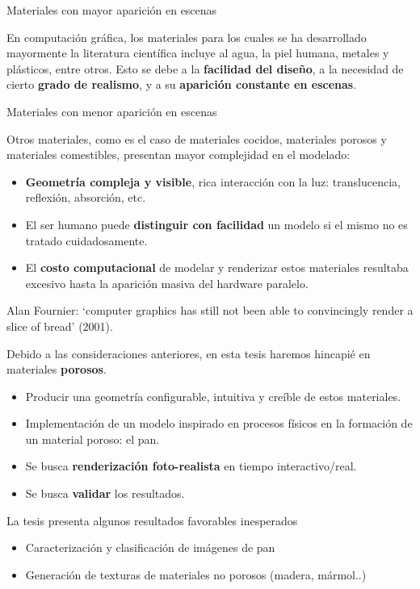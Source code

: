 \documentclass[spanish]{beamer}
\begin{document}
\begin{frame}{Materiales con mayor aparición en escenas}

En computación gráfica, los materiales para los cuales se ha desarrollado mayormente la literatura científica incluye al agua, la piel humana, metales y plásticos, entre otros. Esto se debe a la \textbf{facilidad del diseño}, a la necesidad de cierto \textbf{grado de realismo}, y a su \textbf{aparición constante en escenas}.

\end{frame}

\begin{frame}{Materiales con menor aparición en escenas}

Otros materiales, como es el caso de materiales cocidos, materiales porosos y materiales comestibles, presentan mayor complejidad en el modelado:

\begin{itemize}
\item \textbf{Geometría compleja y visible}, rica interacción con la luz: translucencia, reflexión, absorción, etc.
\item El ser humano puede \textbf{distinguir con facilidad} un modelo si el mismo no es tratado cuidadosamente.
\item El \textbf{costo computacional} de modelar y renderizar estos materiales resultaba excesivo hasta la aparición masiva del hardware paralelo.
\end{itemize}

Alan Fournier: `computer graphics has still not been
able to convincingly render a slice of bread' (2001). 


\end{frame}

\begin{frame}
\begin{block}{}
Debido a las consideraciones anteriores, en esta tesis haremos hincapié en materiales \textbf{porosos}.

\begin{itemize}
\item Producir una geometría configurable, intuitiva y creíble de estos materiales.
\item Implementación de un modelo inspirado en procesos físicos en la formación de un material poroso: el pan.
\item Se busca \textbf{renderización foto-realista} en tiempo interactivo/real.
\item Se busca \textbf{validar} los resultados.
\end{itemize}

La tesis presenta algunos resultados favorables inesperados
\begin{itemize}
\item Caracterización y clasificación de imágenes de pan
\item Generación de texturas de materiales no porosos (madera, mármol..)
\end{itemize}


\end{block}
\end{frame}
\end{document}
